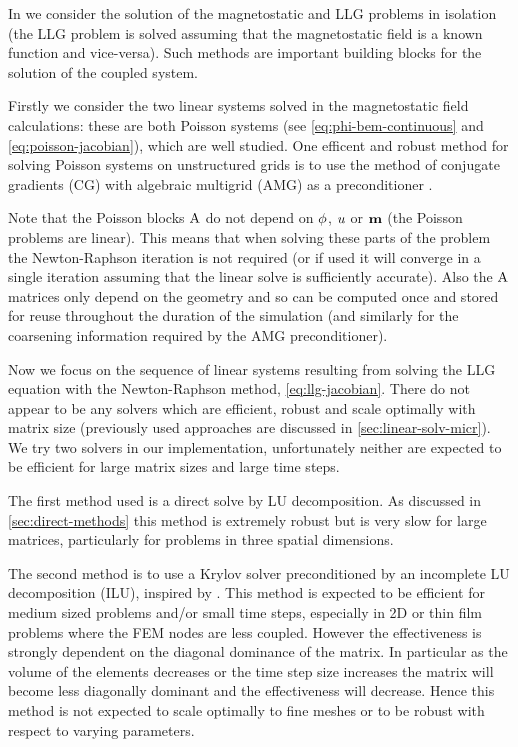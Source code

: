 In  we consider the solution of the magnetostatic and LLG problems in isolation (\ie the LLG problem is solved assuming that the magnetostatic field is a known function and vice-versa).
Such methods are important building blocks for the solution of the coupled system.

Firstly we consider the two linear systems solved in the magnetostatic field calculations: these are both Poisson systems (see \cref{eq:phi-bem-continuous} and \cref{eq:poisson-jacobian}), which are well studied.
One efficent and robust method for solving Poisson systems on unstructured grids is to use the method of conjugate gradients (CG) with algebraic multigrid (AMG) as a preconditioner \cite{Henson2002}.

Note that the Poisson blocks $\mathrm{A}$ do not depend on $\phi$, $u$ or $\boldsymbol{\mathrm{m}}$ (\ie the Poisson problems are linear).
This means that when solving these parts of the problem the Newton-Raphson iteration is not required (or if used it will converge in a single iteration assuming that the linear solve is sufficiently accurate).
Also the $\mathrm{A}$ matrices only depend on the geometry and so can be computed once and stored for reuse throughout the duration of the simulation (and similarly for the coarsening information required by the AMG preconditioner).


Now we focus on the sequence of linear systems resulting from solving the LLG equation with the Newton-Raphson method, \cref{eq:llg-jacobian}.
There do not appear to be any solvers which are efficient, robust and scale optimally with matrix size (previously used approaches are discussed in \cref{sec:linear-solv-micr}).
We try two solvers in our implementation, unfortunately neither are expected to be efficient for large matrix sizes and large time steps.

The first method used is a direct solve by LU decomposition.
As discussed in \cref{sec:direct-methods} this method is extremely robust but is very slow for large matrices, particularly for problems in three spatial dimensions.

The second method is to use a Krylov solver preconditioned by an incomplete LU decomposition (ILU), inspired by \cite{Suess2002}.
This method is expected to be efficient for medium sized problems and/or small time steps, especially in 2D or thin film problems where the FEM nodes are less coupled.
However the effectiveness is strongly dependent on the diagonal dominance of the matrix.
In particular as the volume of the elements decreases or the time step size increases the matrix will become less diagonally dominant and the effectiveness will decrease.
Hence this method is not expected to scale optimally to fine meshes or to be robust with respect to varying parameters.

